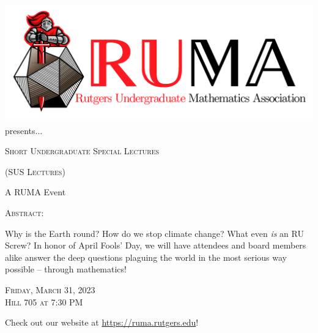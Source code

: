 \documentclass[12pt]{article}
\begin{document}

\begin{center}\includegraphics[scale=.4]{RUMAlogo.png}\\
\large  presents... \\

\vspace{1mm}
\begin{spacing}{1.5}

\begin{center}
	\textsc{\fontsize{32}{18}\selectfont Short Undergraduate Special Lectures}
\end{center}

\begin{center}
	\textsc{\fontsize{22}{18}\selectfont(SUS Lectures)}
\end{center}

\end{spacing}

{\fontsize{24}{18} \selectfont A RUMA Event}  

\normalsize

\vspace{10mm}

\textsc{Abstract:}


\LARGE
Why is the Earth round? How do we stop climate change? What even \textit{is} an RU Screw? In honor of April Fools' Day, we will have attendees and board members alike answer the deep questions plaguing the world in the most serious way possible -- through mathematics!

\vspace{2.5mm}

\begin{spacing}{1.25}
    {\fontsize{24}{28}\selectfont  \textsc{
        Friday, March 31, 2023 \\ Hill 705 at 7:30 PM}
    } 
\end{spacing}

\vspace{2.5mm}

\Large  Check out our website at 
\url{https://ruma.rutgers.edu}!
\end{center}
\end{document}
